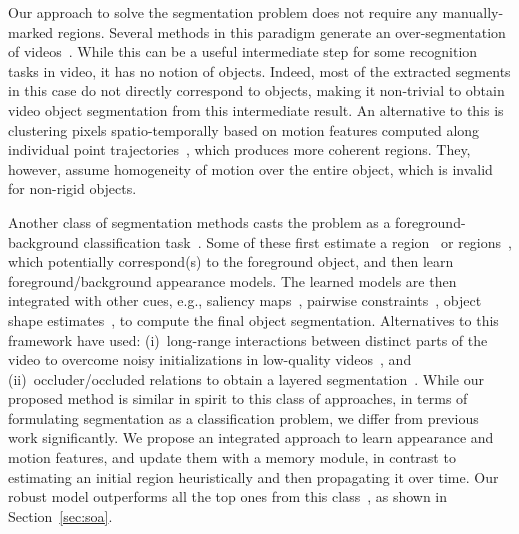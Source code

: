 Our approach to solve the segmentation problem does not require any
manually-marked regions. Several methods in this paradigm generate an
over-segmentation of
videos~\cite{Brendel09,Grundmann10,Lezama11,XuC16,Khoreva15}. While this can be
a useful intermediate step for some recognition tasks in video, it has no
notion of objects. Indeed, most of the extracted segments in this case do not
directly correspond to objects, making it non-trivial to obtain video object
segmentation from this intermediate result. An alternative to this is
clustering pixels spatio-temporally based on motion features computed along
individual point
trajectories~\cite{brox2010object,fragkiadaki2012video,ochs2012higher}, which
produces more coherent regions. They, however, assume homogeneity of motion
over the entire object, which is invalid for non-rigid objects.

Another class of segmentation methods casts the problem as a
foreground-background classification
task~\cite{Faktor14,papazoglou2013fast,wang2015saliency,taylor2015causal,zhang2013video,lee2011key}.
Some of these first estimate a
region~\cite{papazoglou2013fast,wang2015saliency} or
regions~\cite{lee2011key,zhang2013video}, which potentially correspond(s) to
the foreground object, and then learn foreground/background appearance models.
The learned models are then integrated with other cues, e.g., saliency
maps~\cite{wang2015saliency}, pairwise
constraints~\cite{papazoglou2013fast,zhang2013video}, object shape
estimates~\cite{lee2011key}, to compute the final object segmentation.
Alternatives to this framework have used: (i)~long-range interactions between
distinct parts of the video to overcome noisy initializations in low-quality
videos~\cite{Faktor14}, and (ii)~occluder/occluded relations to obtain a
layered segmentation~\cite{taylor2015causal}. While our proposed method is
similar in spirit to this class of approaches, in terms of formulating
segmentation as a classification problem, we differ from previous work
significantly. We propose an integrated approach to learn appearance and motion
features, and update them with a memory module, in contrast to estimating an
initial region heuristically and then propagating it over time. Our robust
model outperforms all the top ones from this
class~\cite{papazoglou2013fast,wang2015saliency,lee2011key,taylor2015causal,Faktor14},
as shown in Section~\ref{sec:soa}.

